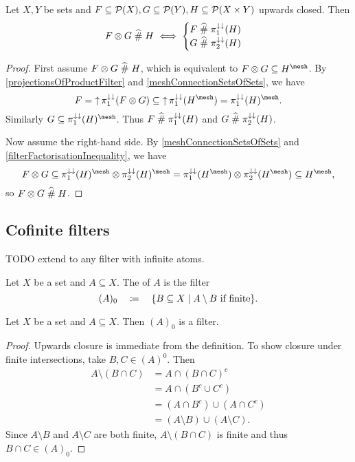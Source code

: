 \begin{lemma} \label{meshProductIsotoneSets}
Let $X,Y$ be sets and $F\subseteq \operatorname{\mathcal{P}}(X), G\subseteq \operatorname{\mathcal{P}}(Y), H\subseteq \operatorname{\mathcal{P}}(X\times Y)$ upwards closed. Then
\[ F\otimes G \mathrel{\widehat{\#}} H \iff \begin{cases}
F \mathrel{\widehat{\#}} \pi_1^{\downarrow\downarrow}(H) \\ G \mathrel{\widehat{\#}} \pi_2^{\downarrow\downarrow}(H)
\end{cases} \]
\end{lemma}
\begin{proof}
First assume $F\otimes G \mathrel{\widehat{\#}} H$, which is equivalent to $F\otimes G\subseteq H^\mesh$.
By \ref{projectionsOfProductFilter} and \ref{meshConnectionSetsOfSets}, we have
\[ F = \upset\pi_1^{\imf\imf}(F\otimes G) \subseteq \upset\pi_1^{\imf\imf}(H^\mesh) = \pi_1^{\imf\imf}(H)^\mesh. \]
Similarly $G\subseteq \pi_1^{\imf\imf}(H)^\mesh$. Thus $F \mathrel{\widehat{\#}} \pi_1^{\downarrow\downarrow}(H)$ and $G \mathrel{\widehat{\#}} \pi_2^{\downarrow\downarrow}(H)$.

Now assume the right-hand side.
By \ref{meshConnectionSetsOfSets} and \ref{filterFactorisationInequality}, we have
\[ F\otimes G \subseteq \pi_1^{\imf\imf}(H)^\mesh\otimes \pi_2^{\imf\imf}(H)^\mesh = \pi_1^{\imf\imf}(H^\mesh)\otimes \pi_2^{\imf\imf}(H^\mesh) \subseteq H^\mesh, \]
so $F\otimes G \mathrel{\widehat{\#}} H$.
\end{proof}

\subsection{Cofinite filters}
TODO extend to any filter with infinite atoms.
\begin{definition}
Let $X$ be a set and $A\subseteq X$. The  of $A$ is the filter
\[ (A)_0 \quad\defeq\quad \setbuilder{B\subseteq X}{\text{$A\setminus B$ if finite}}. \]
\end{definition}

\begin{lemma}
Let $X$ be a set and $A\subseteq X$. Then $(A)_0$ is a filter.
\end{lemma}
\begin{proof}
Upwards closure is immediate from the definition. To show closure under finite intersections, take $B,C\in (A)^0$. Then
\begin{align*}
A\setminus (B\cap C) &= A \cap (B\cap C)^c \\
&= A \cap (B^c\cup C^c) \\
&= (A\cap B^c) \cup (A\cap C^c) \\
&= (A\setminus B) \cup (A\setminus C).
\end{align*}
Since $A\setminus B$ and $A\setminus C$ are both finite, $A\setminus(B\cap C)$ is finite and thus $B\cap C\in (A)_0$.
\end{proof}

